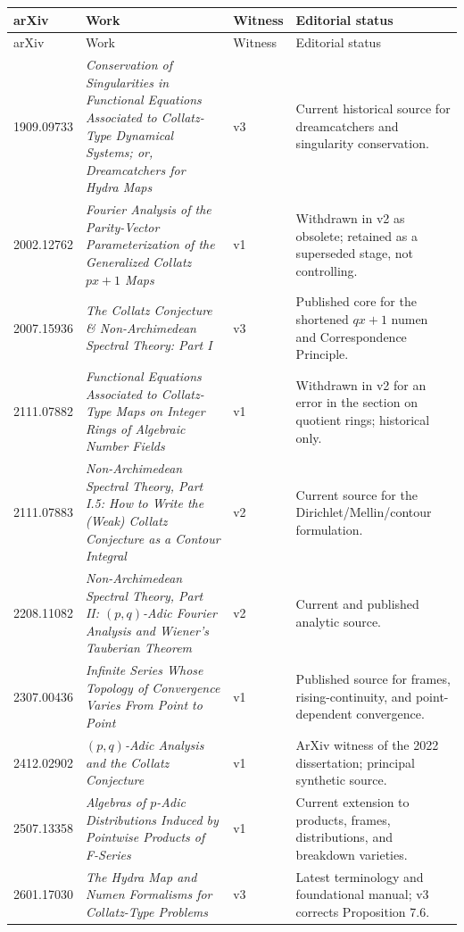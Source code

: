 \begingroup\small
\begin{longtable}{@{}p{}p{}p{}p{}@{}}
\toprule
arXiv & Work & Witness & Editorial status\\
\midrule
\endfirsthead
\toprule
arXiv & Work & Witness & Editorial status\\
\midrule
\endhead
1909.09733 & \emph{Conservation of Singularities in Functional Equations Associated to Collatz-Type Dynamical Systems; or, Dreamcatchers for Hydra Maps} & v3 & Current historical source for dreamcatchers and singularity conservation.\\
2002.12762 & \emph{Fourier Analysis of the Parity-Vector Parameterization of the Generalized Collatz $px+1$ Maps} & v1 & Withdrawn in v2 as obsolete; retained as a superseded stage, not controlling.\\
2007.15936 & \emph{The Collatz Conjecture \& Non-Archimedean Spectral Theory: Part I} & v3 & Published core for the shortened $qx+1$ numen and Correspondence Principle.\\
2111.07882 & \emph{Functional Equations Associated to Collatz-Type Maps on Integer Rings of Algebraic Number Fields} & v1 & Withdrawn in v2 for an error in the section on quotient rings; historical only.\\
2111.07883 & \emph{Non-Archimedean Spectral Theory, Part I.5: How to Write the (Weak) Collatz Conjecture as a Contour Integral} & v2 & Current source for the Dirichlet/Mellin/contour formulation.\\
2208.11082 & \emph{Non-Archimedean Spectral Theory, Part II: $(p,q)$-Adic Fourier Analysis and Wiener's Tauberian Theorem} & v2 & Current and published analytic source.\\
2307.00436 & \emph{Infinite Series Whose Topology of Convergence Varies From Point to Point} & v1 & Published source for frames, rising-continuity, and point-dependent convergence.\\
2412.02902 & \emph{$(p,q)$-Adic Analysis and the Collatz Conjecture} & v1 & ArXiv witness of the 2022 dissertation; principal synthetic source.\\
2507.13358 & \emph{Algebras of $p$-Adic Distributions Induced by Pointwise Products of F-Series} & v1 & Current extension to products, frames, distributions, and breakdown varieties.\\
2601.17030 & \emph{The Hydra Map and Numen Formalisms for Collatz-Type Problems} & v3 & Latest terminology and foundational manual; v3 corrects Proposition 7.6.\\
\bottomrule
\end{longtable}
\endgroup


